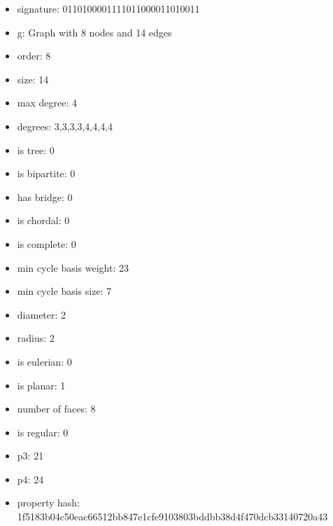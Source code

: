 \begin{itemize}
\item signature: 0110100001111011000011010011
\item g: Graph with 8 nodes and 14 edges
\item order: 8
\item size: 14
\item max degree: 4
\item degrees: 3,3,3,3,4,4,4,4
\item is tree: 0
\item is bipartite: 0
\item has bridge: 0
\item is chordal: 0
\item is complete: 0
\item min cycle basis weight: 23
\item min cycle basis size: 7
\item diameter: 2
\item radius: 2
\item is eulerian: 0
\item is planar: 1
\item number of faces: 8
\item is regular: 0
\item p3: 21
\item p4: 24
\item property hash: 1f5183b04c50eac66512bb847e1cfe9103803bddbb38d4f470dcb33140720a43
\end{itemize}
\newpage
\begin{figure}
\end{figure}
